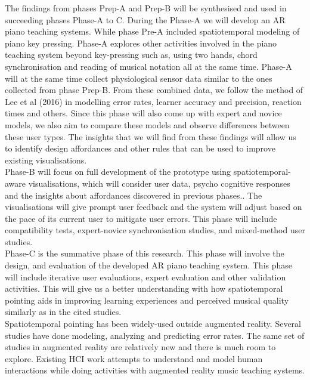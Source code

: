 \documentclass[manuscript,screen]{acmart}
\begin{document}
The findings from phases Prep-A and Prep-B will be synthesised and used in succeeding phases Phase-A to C. During the Phase-A  we will develop an AR piano teaching systems. While phase Pre-A included spatiotemporal modeling of piano key pressing. Phase-A explores other activities involved in the piano teaching system beyond key-pressing such as, using two hands, chord synchronisation and reading of musical notation all at the same time. Phase-A will at the same time collect physiological sensor data similar to the ones collected from phase Prep-B. From these combined data, we follow the method of Lee et al (2016) in modelling error rates, learner accuracy and precision, reaction times and others. Since this phase will also come up with expert and novice models, we also aim to compare these models and observe differences between these user types. The insights that we will find from these findings will allow us to identify design affordances and other rules that can be used to improve existing visualisations.\\

Phase-B will focus on full development of the prototype using spatiotemporal-aware visualisations, which will consider user data, psycho cognitive responses and the insights about affordances discovered in previous phases.. The visualisations will give prompt user feedback and the system will adjust based on the pace of its current user to mitigate user errors. This phase will include compatibility tests, expert-novice synchronisation studies, and mixed-method user studies. \\

Phase-C is the summative phase of this research. This phase will involve the design, and evaluation of the developed AR  piano teaching system. This phase will include iterative user evaluations, expert evaluation and other validation activities. This will give us a better understanding with how spatiotemporal pointing aids in improving learning experiences and perceived musical quality similarly as in the cited studies.\\

Spatiotemporal pointing has been widely-used outside augmented reality. Several studies have done modeling, analyzing and predicting error rates. The same set of studies in augmented reality are relatively new and there is much room to explore. Existing HCI work attempts to understand and model human interactions while doing activities with augmented reality music teaching systems.\\
\end{document}
